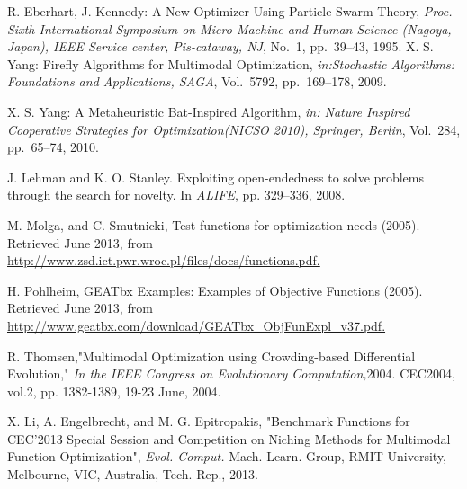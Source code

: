\documentclass{ies2018}
\begin{document}
\begin{thebibliography}{99}
R. Eberhart, J. Kennedy: A New Optimizer Using Particle Swarm Theory,
\textit{Proc. Sixth International Symposium on Micro Machine and Human Science (Nagoya, Japan), IEEE Service center, Pis-cataway, NJ}, No.~1, pp.~39--43, 1995.
X. S. Yang: Firefly Algorithms for Multimodal Optimization,
\textit{in:Stochastic Algorithms: Foundations and Applications, SAGA}, Vol.~5792, pp.~169--178, 2009.

X. S. Yang: A Metaheuristic Bat-Inspired Algorithm,
 \textit{in: Nature Inspired Cooperative Strategies for Optimization(NICSO 2010), Springer, Berlin}, Vol.~284, pp.~65--74, 2010.

J. Lehman and K. O. Stanley.
\newblock Exploiting open-endedness to solve problems through the search for novelty.
\newblock In {\em ALIFE}, pp. 329--336, 2008.

M. Molga, and C. Smutnicki, Test functions for optimization needs (2005). Retrieved June 2013, from \url{http://www.zsd.ict.pwr.wroc.pl/files/docs/functions.pdf.}

H. Pohlheim, GEATbx Examples: Examples of Objective Functions (2005). Retrieved June 2013, from \url{http://www.geatbx.com/download/GEATbx_ObjFunExpl_v37.pdf.}

R. Thomsen,"Multimodal Optimization using Crowding-based Differential Evolution," {\it In the IEEE Congress on Evolutionary Computation,}2004. CEC2004, vol.2, pp. 1382-1389, 19-23 June, 2004.

X. Li, A. Engelbrecht, and M. G. Epitropakis, "Benchmark Functions for CEC'2013 Special Session and Competition on Niching Methods for Multimodal Function Optimization", {\it Evol. Comput.} Mach. Learn. Group, RMIT University, Melbourne, VIC, Australia, Tech. Rep., 2013.





\end{thebibliography}
\end{document}
